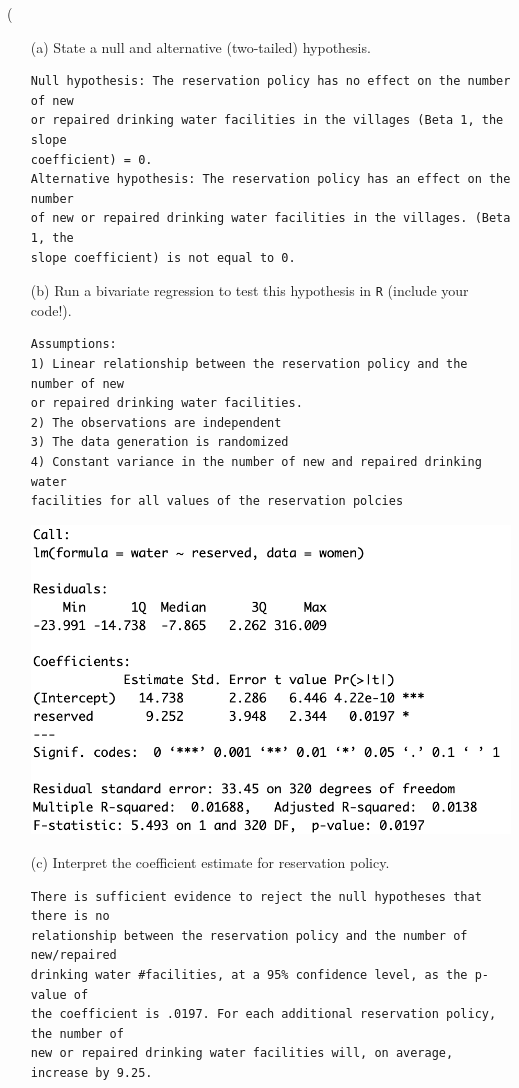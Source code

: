 \left( \documentclass[12pt,letterpaper]{article}
\begin{document}
\newpage
\begin{enumerate}
	\item [(a)] State a null and alternative (two-tailed) hypothesis. 
	
	
\begin{verbatim}
Null hypothesis: The reservation policy has no effect on the number of new 
or repaired drinking water facilities in the villages (Beta 1, the slope
coefficient) = 0. 
Alternative hypothesis: The reservation policy has an effect on the number 
of new or repaired drinking water facilities in the villages. (Beta 1, the 
slope coefficient) is not equal to 0. 

\end{verbatim}
		
	\vspace{3cm}
	\item [(b)] Run a bivariate regression to test this hypothesis in \texttt{R} (include your code!).
	
			

\begin{verbatim}
Assumptions: 
1) Linear relationship between the reservation policy and the number of new 
or repaired drinking water facilities.
2) The observations are independent
3) The data generation is randomized
4) Constant variance in the number of new and repaired drinking water 
facilities for all values of the reservation polcies

\end{verbatim}

\includegraphics[width=.75\textwidth]{regression_summary.png}






	\vspace{3cm}
	\item [(c)] Interpret the coefficient estimate for reservation policy. 
	
\begin{verbatim}
There is sufficient evidence to reject the null hypotheses that there is no
relationship between the reservation policy and the number of new/repaired
drinking water #facilities, at a 95% confidence level, as the p-value of 
the coefficient is .0197. For each additional reservation policy, the number of 
new or repaired drinking water facilities will, on average, increase by 9.25.
\end{verbatim}

\end{enumerate}
\end{document}
